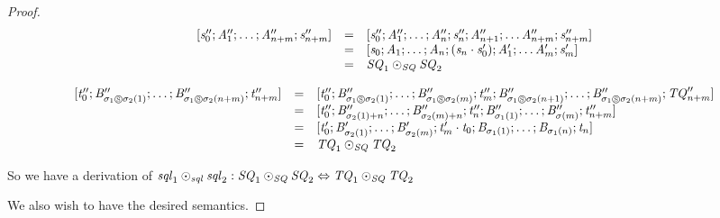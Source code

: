 \documentclass[numbers,10pt,preprint\ifanon ,nocopyrightspace\fi]{sigplanconf}
\begin{document}
\begin{proof}
  \[
    \begin{array}{rcl}
      [\mathit{s}_0'';\mathit{A}_1'';\ldots;\mathit{A}_{n+m}'';\mathit{s}_{n+m}'']
      & = & [\mathit{s}_0'';\mathit{A}_1'';\ldots;\mathit{A}_n'';\mathit{s}_n'';\mathit{A}_{n+1}'';
            \ldots\mathit{A}_{n+m}'';\mathit{s}_{n+m}'']\\
      & = & [\mathit{s}_0;\mathit{A}_1;\ldots;\mathit{A}_n;(\mathit{s}_n\cdot\mathit{s}_0');\mathit{A}_1';
            \ldots\mathit{A}_m';\mathit{s}_m']\\
      & = & \mathit{SQ}_1\odot_{\mathit{SQ}}\mathit{SQ}_2
    \end{array}
  \]


  \[
    \begin{array}{rcl}
      [\mathit{t}_0'';\mathit{B}_{\sigma_1\circledS\sigma_2(1)}'';\ldots;
      \mathit{B}_{\sigma_1\circledS\sigma_2(n+m)}'';\mathit{t}_{n+m}'']
      & = &
            [\mathit{t}_0'';\mathit{B}_{\sigma_1\circledS\sigma_2(1)}'';
            \ldots;\mathit{B}_{\sigma_1\circledS\sigma_2(m)}'';
            \mathit{t}_m'';\mathit{B}_{\sigma_1\circledS\sigma_2(n+1)}'';
            \ldots;
            \mathit{B}_{\sigma_1\circledS\sigma_2(n+m)}'';\mathit{TQ}_{n+m}'']\\
      & = &
            [\mathit{t}_0'';\mathit{B}_{\sigma_2(1)+n}'';
            \ldots;\mathit{B}_{\sigma_2(m)+n}'';
            \mathit{t}_n'';\mathit{B}_{\sigma_1(1)}'';
            \ldots;
            \mathit{B}_{\sigma(m)}'';\mathit{t}_{n+m}'']\\
      & = &
            [\mathit{t}_0';\mathit{B}_{\sigma_2(1)}';
            \ldots;\mathit{B}_{\sigma_2(m)}';
            \mathit{t}_m'\cdot\mathit{t}_0;\mathit{B}_{\sigma_1(1)};
            \ldots;
            \mathit{B}_{\sigma_1(n)};\mathit{t}_n]\\
      & = & \mathit{TQ}_1\odot_{\mathit{SQ}}\mathit{TQ}_2
    \end{array}
  \]

  So we have a derivation of $\mathit{sql}_1\odot_{\mathit{sql}}\mathit{sql}_2 :
  \mathit{SQ}_1\odot_{\mathit{SQ}}\mathit{SQ}_2 \Leftrightarrow
  \mathit{TQ}_1\odot_{\mathit{SQ}}\mathit{TQ}_2$

  We also wish to have the desired semantics.


\end{proof}
\end{document}
